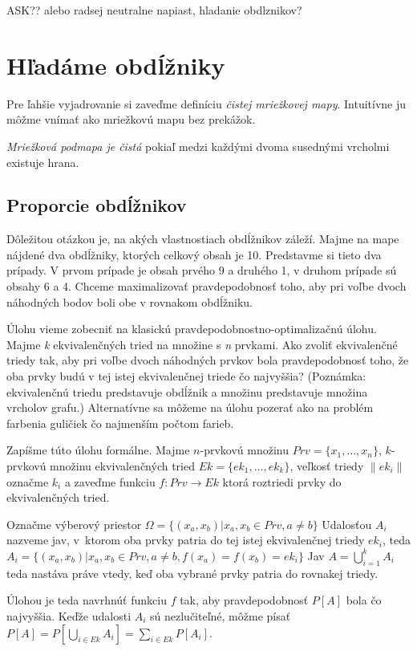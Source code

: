 ASK?? alebo radsej neutralne napiast, hladanie obdlznikov?
\section{Hľadáme obdĺžniky}

Pre ľahšie vyjadrovanie si zaveďme definíciu {\sl čistej mriežkovej mapy}. Intuitívne ju môžme vnímať ako mriežkovú
mapu bez prekážok.

\begin{define}
{\sl Mriežková podmapa je čistá} 
pokiaľ medzi každými dvoma susednými vrcholmi existuje hrana.
\end{define}

\subsection{Proporcie obdĺžnikov}
Dôležitou otázkou je, na akých vlastnostiach obdĺžnikov záleží.
Majme na mape nájdené dva obdĺžniky, ktorých celkový obsah je 10.
Predstavme si tieto dva prípady. V prvom prípade je obsah prvého 9 a druhého 1, v druhom prípade sú obsahy 6 a 4. 
Chceme maximalizovať pravdepodobnosť toho, aby pri voľbe dvoch náhodných bodov boli obe v rovnakom obdĺžniku.

Úlohu vieme zobecniť na klasickú pravdepodobnostno-optimalizačnú úlohu.
Majme {\sl k} ekvivalenčných tried na množine s {\sl n} prvkami. Ako zvoliť ekvivalenčné triedy tak, 
aby pri voľbe dvoch náhodných prvkov bola pravdepodobnosť toho, 
že oba prvky budú v tej istej ekvivalenčnej triede čo najvyššia?
(Poznámka: ekvivalenčnú triedu predstavuje obdĺžnik a množinu predstavuje množina vrcholov grafu.)
Alternatívne sa môžeme na úlohu pozerať ako na problém farbenia guličiek čo najmenším počtom farieb.

Zapíšme túto úlohu formálne.
Majme $n$-prvkovú množinu $Prv = \{x_1,\ldots,x_n\}$, $k$-prvkovú množinu ekvivalenčných tried $Ek = \{ek_1,\ldots, ek_k\}$, veľkosť 
triedy $\|ek_i\|$ označme $k_i$ a zaveďme funkciu $f \colon Prv \to Ek$ ktorá roztriedi prvky do ekvivalenčných tried.

Označme výberový priestor $\Omega = \{(x_a, x_b) | x_a, x_b \in Prv, a \not= b \}$
Udalosťou $A_i$ nazveme jav, v~ktorom oba prvky patria do tej istej ekvivalenčnej triedy $ek_i$,
teda $A_i = \{(x_a, x_b) | x_a, x_b \in Prv, a \not= b, f(x_a) = f(x_b) = ek_i \}$
Jav $A = \bigcup_{i=1}^{k} A_i$ teda nastáva práve vtedy,
 keď oba vybrané prvky patria do rovnakej triedy.

Úlohou je teda navrhnúť funkciu $f$ tak, aby pravdepodobnosť $P[A]$ bola čo najvyššia. 
Keďže udalosti $A_i$ sú nezlučiteľné, môžme písať 
$P[A] = P[\bigcup_{i \in Ek} A_i] = \sum_{i \in Ek}P[A_i]$.

